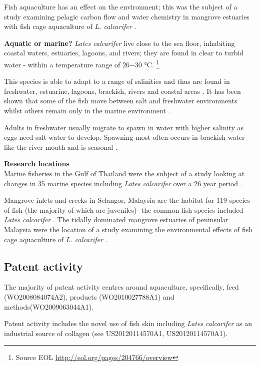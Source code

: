 \documentclass[openany]{book}
\let\rmarkdownfootnote\footnote%
\def\footnote{\protect\rmarkdownfootnote}
\theoremstyle{definition}
\theoremstyle{definition}
\theoremstyle{definition}
\theoremstyle{remark}
\begin{document}
Fish aquaculture has an effect on the environment; this was the subject
of a study examining pelagic carbon flow and water chemistry in mangrove
estuaries with fish cage aquaculture of \emph{L. calcarifer}
\citep{Alongi_2003}.

\textbf{Aquatic or marine?} \emph{Lates calcarifer} live close to the
sea floor, inhabiting coastal waters, estuaries, lagoons, and rivers;
they are found in clear to turbid water - within a temperature range of
26−30 °C. \footnote{Source EOL
  \url{http://eol.org/pages/204766/overview}}

This species is able to adapt to a range of salinities and thus are
found in freshwater, estuarine, lagoons, brackish, rivers and coastal
areas \citep{Davis_1986}. It has been shown that some of the fish move
between salt and freshwater environments whilst others remain only in
the marine environment \citep{Davis_1986}.

Adults in freshwater usually migrate to spawn in water with higher
salinity as eggs need salt water to develop. Spawning most often occurs
in brackish water like the river mouth and is seasonal
\citep{Moore_1982}.

\textbf{Research locations}\\
Marine fisheries in the Gulf of Thailand were the subject of a study
looking at changes in 35 marine species including \emph{Lates
calcarifer} over a 26 year period \citep{Tuantong_2015}.

Mangrove inlets and creeks in Selangor, Malaysia are the habitat for 119
species of fish (the majority of which are juveniles)- the common fish
species included \emph{Lates calcarifer} \citep{Sasekumar_1992}. The
tidally dominated mangrove estuaries of peninsular Malaysia were the
location of a study examining the environmental effects of fish cage
aquaculture of \emph{L. calcarifer} \citep{Alongi_2003}.

\hypertarget{patent-activity-1}{%
\subsection{Patent activity}\label{patent-activity-1}}

The majority of patent activity centres around aquaculture,
specifically, feed (WO2008084074A2), products (WO2010027788A1) and
methods(WO2009063044A1).

Patent activity includes the novel use of fish skin including
\emph{Lates calcarifer} as an industrial source of collagen (see
US20120114570A1, US20120114570A1).
\end{document}
